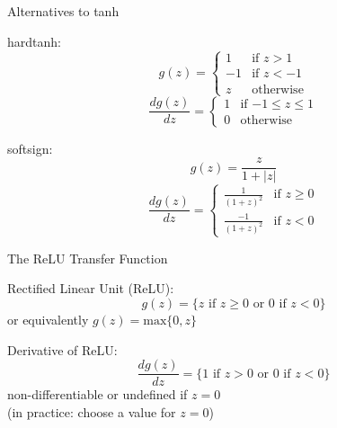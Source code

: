 \begin{frame}{Alternatives to tanh}

\begin{alertblock}{hardtanh:}
\[ g(z) = \left\{ \begin{array}{cc}
 	1 & \textrm{if $z > 1$} \\
 	-1 & \textrm{if $z < -1$} \\
 	z & \textrm{otherwise}
 \end{array}
 \right.
\]
\[ \frac{d g(z)}{dz} = \left\{ \begin{array}{cc}
 	1 & \textrm{if $-1 \leq z \leq 1$} \\
 	0 & \textrm{otherwise}
 \end{array}
 \right. \]
\end{alertblock}

\pause

\begin{alertblock}{softsign:}
\[ g(z) = \frac{z}{1 + |z|} \]
\[ \frac{d g(z)}{dz} = \left\{ \begin{array}{cc}
 	\frac{1}{(1 + z)^2} & \textrm{if $z \geq 0$} \\
 	\frac{-1}{(1 + z)^2} & \textrm{if $z < 0$}
 \end{array}
 \right. \]
\end{alertblock}
\end{frame}


\begin{frame}{The ReLU Transfer Function}
\begin{block}{Rectified Linear Unit (ReLU):}
\[ g(z) = \{ z \textrm{ if } z \geq 0 \textrm{ or } 0 \textrm{ if } z < 0 \} \]
or equivalently $g(z) = \textrm{max}\{0,z\}$
\end{block}

\pause
\begin{block}{Derivative of ReLU:}
\[ \frac{d g(z)}{dz} = \{ 1 \textrm{ if } z > 0 \textrm{ or } 0 \textrm{ if } z < 0 \} \]
non-differentiable or undefined if $z = 0$ \\
(in practice: choose a value for $z = 0$)
\end{block}
\end{frame}

